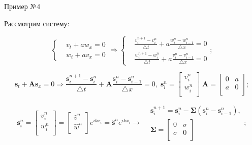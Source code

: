 \documentclass[10pt,xcolor=pst,aspectratio=169]{beamer}
\begin{document}
\begin{frame}{Пример №4}

    \transdissolve[duration=0.1]
    \justifying
    \large

    Рассмотрим систему:
    
    \[
        \begin{cases}
            &v_{t} + a w_{x} = 0 \\
            &w_{t} + a v_{x} = 0
        \end{cases}
        \Rightarrow
        \begin{cases}
            &\frac{v^{n + 1}_{i} - v^{n}_{i}}{\triangle t} + a \frac{w^{n}_{i} - w^{n}_{i - 1}}{\triangle x} = 0 \\
            &\frac{w^{n + 1}_{i} - w^{n}_{i}}{\triangle t} + a \frac{v^{n}_{i} - v^{n}_{i - 1}}{\triangle x} = 0
        \end{cases};
    \]

    \[
        \mathbf{s}_{t} + \mathbf{A} \mathbf{s}_{x} = 0
        \Rightarrow
        \frac{\mathbf{s}^{n + 1}_{i} - \mathbf{s}^{n}_{i}}{\triangle t} + \mathbf{A} \frac{\mathbf{s}^{n}_{i} - \mathbf{s}^{n}_{i - 1}}{\triangle x} = 0, \;
        \mathbf{s}^{n}_{i}
        =
        \begin{bmatrix}
           v^{n}_{i} \\
           w^{n}_{i} \\
        \end{bmatrix} \;
        \mathbf{A}
        =
        \begin{bmatrix}
           0 & a \\
           a & 0 \\
        \end{bmatrix};
    \]

    \[
        \boxed{
        \mathbf{s}^{n}_{i}
        =
        \begin{bmatrix}
           v^{n}_{i} \\
           w^{n}_{i} \\
        \end{bmatrix}
        =
        \begin{bmatrix}
           \hat{v}^{n} \\
           \hat{w}^{n} \\
        \end{bmatrix} e^{i k x_{i}}
        =
        \hat{\mathbf{s}}^{n} e^{i k x_{i}}
        }
        \rightarrow
        \boxed{
        \begin{split}
            &\mathbf{s}^{n + 1}_{i} = \mathbf{s}^{n}_{i} - \bm{\Sigma} \left( \mathbf{s}^{n}_{i} - \mathbf{s}^{n}_{i - 1} \right), \\
            &\bm{\Sigma}
            =
            \begin{bmatrix}
               0 & \sigma \\
               \sigma & 0 \\
            \end{bmatrix}
        \end{split}
        };
    \]


\end{frame}
\end{document}
